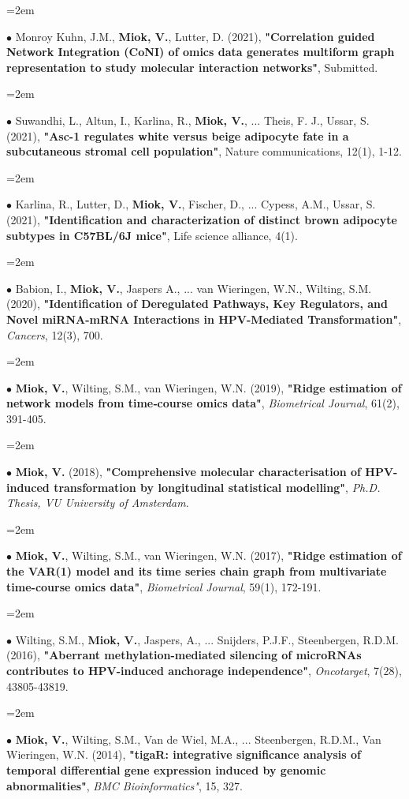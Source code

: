 \documentclass{scrartcl}
\newcommand{\Description}[1]{\hangindent=2em\hangafter=0\noindent\raggedright\footnotesize{#1}\par\normalsize\vspace{1em}} %
\begin{document}
\begin{cv}{}
\Description{$\bullet$ Monroy Kuhn, J.M., \textbf{Miok, V.}, Lutter, D.  (2021), \textbf{"Correlation guided Network Integration (CoNI) of omics data generates multiform graph representation to study molecular interaction networks"}, Submitted.}
\vspace{-5pt}
\Description{$\bullet$ Suwandhi, L., Altun, I., Karlina, R.,  \textbf{Miok, V.}, ... Theis, F. J., Ussar, S.  (2021), \textbf{"Asc-1 regulates white versus beige adipocyte fate in a subcutaneous stromal cell population"}, Nature communications, 12(1), 1-12.}
\vspace{-5pt}
\Description{$\bullet$ Karlina, R., Lutter, D., \textbf{Miok, V.}, Fischer, D., ... Cypess, A.M., Ussar, S. (2021), \textbf{"Identification and characterization of distinct brown adipocyte subtypes in C57BL/6J mice"}, Life science alliance, 4(1).}
\vspace{-5pt}
\Description{$\bullet$ Babion, I., \textbf{Miok, V.}, Jaspers A., ... van Wieringen, W.N., Wilting, S.M. (2020), \textbf{"Identification of Deregulated Pathways, Key Regulators, and Novel miRNA-mRNA Interactions in HPV-Mediated Transformation"}, \textit{Cancers}, 12(3), 700.}
\vspace{-5pt}
\Description{$\bullet$ \textbf{Miok, V.}, Wilting, S.M., van Wieringen, W.N. (2019), \textbf{"Ridge estimation of network models from time‐course omics data"}, \textit{Biometrical Journal}, 61(2), 391-405.}
\vspace{-5pt}
\Description{$\bullet$ \textbf{Miok, V.} (2018), \textbf{"Comprehensive molecular characterisation of HPV-induced transformation by longitudinal statistical modelling"}, \textit{Ph.D. Thesis, VU University of Amsterdam}.}
\vspace{-5pt}
\Description{$\bullet$ \textbf{Miok, V.}, Wilting, S.M., van Wieringen, W.N. (2017), \textbf{"Ridge estimation of the VAR(1) model and its time series chain graph from multivariate time-course omics data"}, \textit{Biometrical Journal}, 59(1), 172-191.}
\vspace{-5pt}
\Description{$\bullet$ Wilting, S.M., \textbf{Miok, V.}, Jaspers, A., ... Snijders, P.J.F., Steenbergen, R.D.M. (2016), \textbf{"Aberrant methylation-mediated silencing of microRNAs contributes to HPV-induced anchorage independence"}, \textit{Oncotarget}, 7(28), 43805-43819.}
\vspace{-5pt}
\Description{$\bullet$ \textbf{Miok, V.}, Wilting, S.M., Van de Wiel, M.A., ... Steenbergen, R.D.M., Van Wieringen, W.N. (2014), \textbf{"tigaR: integrative significance analysis of temporal differential gene expression induced by genomic abnormalities"}, \textit{BMC Bioinformatics"}, 15, 327. }


\end{cv}
\end{document}
